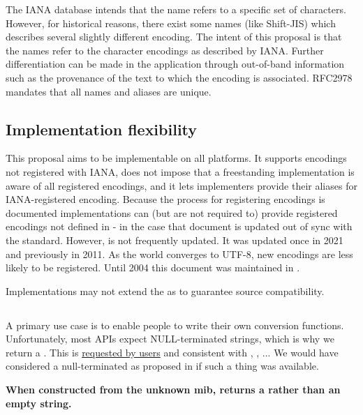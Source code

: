 \documentclass{wg21}
\begin{document}
The IANA database intends that the name refers to a specific set of characters.
However, for historical reasons, there exist some names (like Shift-JIS) which describes several slightly different encoding.
The intent of this proposal is that the names refer to the character encodings as described by IANA.
Further differentiation can be made in the application through out-of-band information such as the provenance of the text to which the encoding is associated. RFC2978 mandates that all names and aliases are unique.

\subsection{Implementation flexibility}

This proposal aims to be implementable on all platforms. It supports encodings not registered with IANA, does not impose that
a freestanding implementation is aware of all registered encodings, and it lets implementers provide their aliases for IANA-registered encoding.
Because the process for registering encodings is documented \cite{rfc2978} implementations can (but are not required to) provide
registered encodings not defined in \cite{ianacharset-mib} - in the case that document is updated out of sync with the standard.
However, \cite{ianacharset-mib} is not frequently updated. It was updated once in 2021 and previously in 2011.
As the world converges to UTF-8, new encodings are less likely to be registered.
Until 2004 this document was maintained in \cite{rfc3808}.

Implementations may not extend the  as to guarantee source compatibility.

\subsection{}

A primary use case is to enable people to write their own conversion functions.
Unfortunately, most APIs expect NULL-terminated strings, which is why we return a .
This is \href{https://gcc.gnu.org/bugzilla/show_bug.cgi?id=98576#c2}{requested by users} and consistent with ,
, ...
We would have considered a null-terminated  as proposed in  if such a thing was available.

\textbf{When constructed from the unknown mib,  returns a  rather than an empty string.}
\end{document}
